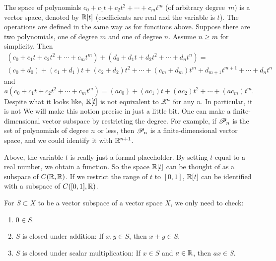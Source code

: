 \begin{example}
The space of polynomials $c_0 + c_1 t + c_2 t^2 + \cdots + c_m t^m$
(of arbitrary degree~$m$) is a vector space,
denoted by ${\mathbb{R}}[t]$ (coefficients are real and
the variable is $t$).  The operations are defined in the same way as for
functions above.
Suppose there are
two polynomials, one of degree $m$ and one of degree $n$.  Assume $n
\geq m$ for simplicity.  Then
\begin{multline*}
(c_0 + c_1 t + c_2 t^2 + \cdots + c_m t^m)
+
(d_0 + d_1 t + d_2 t^2 + \cdots + d_n t^n)
= \\
(c_0+d_0) + (c_1+d_1) t + (c_2 + d_2) t^2 + \cdots + (c_m+d_m) t^m
+ d_{m+1} t^{m+1} + \cdots + d_n t^n
\end{multline*}
and
\begin{equation*}
a(c_0 + c_1 t + c_2 t^2 + \cdots + c_m t^m)
=
(ac_0) + (ac_1) t + (ac_2) t^2 + \cdots + (ac_m) t^m  .
\end{equation*}
Despite what it looks like, ${\mathbb{R}}[t]$ is not equivalent to ${\mathbb{R}}^n$ for any $n$.  In
particular, it is not   We will make this notion
precise in just a little bit.  One can make a
finite-dimensional vector subspace by restricting the degree.  For example,
if ${\mathscr{P}}_n$ is the set of polynomials of degree $n$ or less,
then ${\mathscr{P}}_n$ is a finite-dimensional vector space, and we could 
identify it with ${\mathbb{R}}^{n+1}$.

Above, the variable $t$ is really just a formal placeholder.
By setting $t$ equal to a real number, we obtain a function.
So the space ${\mathbb{R}}[t]$ can be thought of as a subspace of $C({\mathbb{R}},{\mathbb{R}})$.
If we restrict the range of $t$ to $[0,1]$, ${\mathbb{R}}[t]$ can be identified with
a subspace of $C([0,1],{\mathbb{R}})$.
\end{example}

\begin{prop}
For $S \subset X$ to be a vector subspace
of a vector space $X$, we only need to check:
\begin{enumerate}[1)]
\item
$0 \in S$.
\item
$S$ is closed under addition: If $x,y \in S$, then $x+y \in S$.
\item
$S$ is closed under scalar multiplication:
If $x \in S$ and $a \in {\mathbb{R}}$, then $ax \in S$.
\end{enumerate}
\end{prop}

